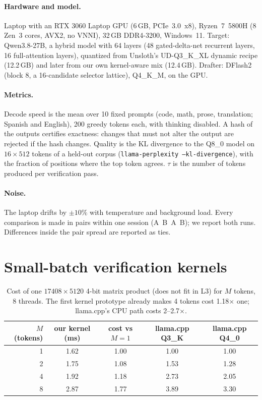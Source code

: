 \documentclass[10pt]{article}
\begin{document}
\paragraph{Hardware and model.} Laptop with an RTX 3060 Laptop GPU (6\,GB, PCIe~3.0~x8), Ryzen~7~5800H (8 Zen~3 cores,
AVX2, no VNNI), 32\,GB DDR4-3200, Windows~11. Target: Qwen3.8-27B, a hybrid model with 64 layers (48 gated-delta-net
recurrent layers, 16 full-attention layers), quantized from Unsloth's UD-Q3\_K\_XL dynamic recipe (12.2\,GB) and later
from our own kernel-aware mix (12.4\,GB). Drafter: DFlash2 (block 8, a 16-candidate selector lattice), Q4\_K\_M, on
the GPU.

\paragraph{Metrics.} Decode speed is the mean over 10 fixed prompts (code, math, prose, translation; Spanish and
English), 200 greedy tokens each, with thinking disabled. A hash of the outputs certifies exactness: changes that
must not alter the output are rejected if the hash changes. Quality is the KL divergence to the Q8\_0 model on
$16\times512$ tokens of a held-out corpus (\texttt{llama-perplexity --kl-divergence}), with the fraction of positions
where the top token agrees. $\tau$ is the number of tokens produced per verification pass.

\paragraph{Noise.} The laptop drifts by $\pm10\%$ with temperature and background load. Every comparison is made in
pairs within one session (A~B~A~B); we report both runs. Differences inside the pair spread are reported as ties.

\section{Small-batch verification kernels}\label{sec:kernels}

\begin{table}[t]
\centering\small
\begin{tabular}{rcccc}
\toprule
$M$ (tokens) & our kernel (ms) & cost vs $M{=}1$ & llama.cpp Q3\_K & llama.cpp Q4\_0 \\
\midrule
1 & 1.62 & 1.00 & 1.00 & 1.00 \\
2 & 1.75 & 1.08 & 1.53 & 1.28 \\
4 & 1.92 & 1.18 & 2.73 & 2.05 \\
8 & 2.87 & 1.77 & 3.89 & 3.30 \\
\bottomrule
\end{tabular}
\caption{Cost of one $17408\times5120$ 4-bit matrix product (does not fit in L3) for $M$ tokens, 8 threads. The
first kernel prototype already makes 4 tokens cost 1.18$\times$ one; llama.cpp's CPU path costs 2--2.7$\times$.}
\label{tab:kernel}
\end{table}
\end{document}

